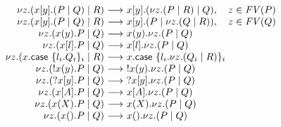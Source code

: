 \documentclass{easychair}
\makeatletter
\newcommand{\ba}{\begin{array}}
\newcommand{\ea}{\end{array}}
\newenvironment{equations}{\[\ba{@{}r@{~}c@{~}l@{}}}{\ea\]}
\newcommand{\key}{\mathsf}
\newcommand{\set}[1]{\{ #1 \}}
\newcommand{\row}[2]{\set{#1}_{#2}}
\newcommand{\la}{l}
\newcommand{\cpCut}[3]{\nu {#1}.({#2} \mid {#3})}
\newcommand{\cpOutput}[4]{{#1}[{#2}].({#3} \mid {#4})}
\newcommand{\cpInput}[3]{{#1}({#2}).{#3}}
\newcommand{\cpInject}[3]{{#1}[{#2}].{#3}}
\newcommand{\cpCase}[2]{{#1}.\key{case}~{#2}}
\newcommand{\cpServe}[3]{!{#1}({#2}).{#3}}
\newcommand{\cpRequest}[3]{?{#1}[{#2}].{#3}}
\newcommand{\cpEmptyIn}[2]{{#1}().{#2}}
\newcommand{\cpSendType}[3]{{#1}[{#2}].{#3}}
\newcommand{\cpReceiveType}[3]{{#1}({#2}).{#3}}
\newcommand{\FV}[1]{\mathit{FV}(#1)}
\newcommand{\redto}{\longrightarrow}
\makeatother
\begin{document}
\begin{equations}
\cpCut{z}{\cpOutput{x}{y}{P}{Q}}{R}
  &\redto& \cpOutput{x}{y}{\cpCut{z}{P}{R}}{Q}, \quad z \in \FV{P} \\
\cpCut{z}{\cpOutput{x}{y}{P}{Q}}{R}
  &\redto& \cpOutput{x}{y}{P}{\cpCut{z}{Q}{R}}, \quad z \in \FV{Q} \\
\cpCut{z}{\cpInput{x}{y}{P}}{Q}
  &\redto& \cpInput{x}{y}{\cpCut{z}{P}{Q}} \\
\cpCut{z}{\cpInject{x}{\la}{P}}{Q}
  &\redto& \cpInject{x}{\la}{\cpCut{z}{P}{Q}} \\
\cpCut{z}{\cpCase{x}{\row{\la_i.Q_i}{i}}}{R}
  &\redto& \cpCase{x}{\row{\la_i.\cpCut{z}{Q_i}{R}}{i}} \\
\cpCut{z}{\cpServe{x}{y}{P}}{Q}
  &\redto& \cpServe{x}{y}{\cpCut{z}{P}{Q}} \\
\cpCut{z}{\cpRequest{x}{y}{P}}{Q}
  &\redto& \cpRequest{x}{y}{\cpCut{z}{P}{Q}} \\
\cpCut{z}{\cpSendType{x}{A}{P}}{Q}
  &\redto& \cpSendType{x}{A}{\cpCut{z}{P}{Q}} \\
\cpCut{z}{\cpReceiveType{x}{X}{P}}{Q}
  &\redto& \cpReceiveType{x}{X}{\cpCut{z}{P}{Q}} \\
\cpCut{z}{\cpEmptyIn{x}{P}}{Q}
  &\redto& \cpEmptyIn{x}{\cpCut{z}{P}{Q}} \\
\end{equations}%
\end{document}

